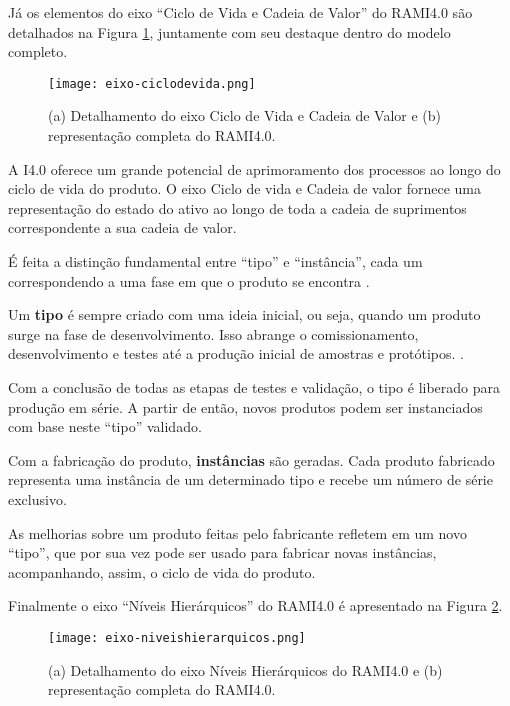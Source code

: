 	Já os elementos do eixo ``Ciclo de Vida e Cadeia de Valor'' do RAMI4.0 são detalhados na Figura \ref{fig:eixo-ciclodevida}, juntamente com seu destaque dentro do modelo completo.
	
	\begin{figure}[H]
		\centering
		\caption{(a) Detalhamento do eixo Ciclo de Vida e Cadeia de Valor e (b) representação completa do RAMI4.0.}
		\texttt{[image: eixo-ciclodevida.png]}
		\label{fig:eixo-ciclodevida}
	\end{figure}


	A I4.0 oferece um grande potencial de aprimoramento dos processos ao longo do ciclo de vida do produto. O eixo Ciclo de vida e Cadeia de valor fornece uma representação do estado do ativo ao longo de toda a cadeia de suprimentos correspondente a sua cadeia de valor. 
	
	É feita a distinção fundamental entre ``tipo'' e ``instância'', cada um correspondendo a uma fase em que o produto se encontra \cite{adolphs2015rami}.
	
	Um \textbf{tipo} é sempre criado com uma ideia inicial, ou seja, quando um produto surge na fase de desenvolvimento. Isso abrange o comissionamento, desenvolvimento e testes até a produção inicial de amostras e protótipos. \cite{adolph2018roadmap}. 
	
	Com a conclusão de todas as etapas de testes e validação, o tipo é liberado para produção em série. A partir de então, novos produtos podem ser instanciados com base neste ``tipo'' validado. 
	
	Com a fabricação do produto, \textbf{instâncias} são geradas. Cada produto fabricado representa uma instância de um determinado tipo e recebe um número de série exclusivo.
	
	As melhorias sobre um produto feitas pelo fabricante refletem em um novo ``tipo'', que por sua vez pode ser usado para fabricar novas instâncias, acompanhando, assim, o ciclo de vida do produto.

	Finalmente o eixo ``Níveis Hierárquicos'' do RAMI4.0 é apresentado na Figura \ref{fig:eixo-niveishierarquicos}.
	
	\begin{figure}[H]
		\centering
		\caption{(a) Detalhamento do eixo Níveis Hierárquicos do RAMI4.0 e (b) representação completa do RAMI4.0.}
		\texttt{[image: eixo-niveishierarquicos.png]}
		\label{fig:eixo-niveishierarquicos}
	\end{figure}

